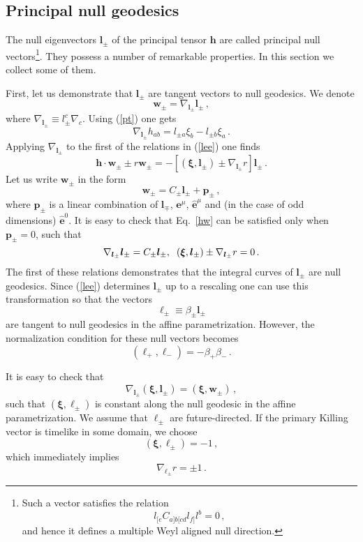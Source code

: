 \documentclass[superscriptaddress,twocolumn,showpacs,
preprintnumbers,amsmath,amssymb,nofootinbib,
longbibliography,aps,prd,10pt]{revtex4-1}
\newcommand{\hhh}{,\hspace{0.2cm}}
\newcommand{\ts}[1]{{\boldsymbol{#1}}}         %
\newcommand{\be}{\begin{equation}}             %
\newcommand{\ee}{\end{equation}}               %
\newcommand{\n}[1]{\label{#1}}
\begin{document}
\subsection{Principal null geodesics}

The null eigenvectors $\ts{l}_{\pm}$ of the principal tensor $\ts{h}$ are called principal null vectors\footnote{
Such a vector satisfies the relation \cite{Frolov:2017kze,Ortaggio:2017ydo}
\[
{l}_{[e}C_{a]b[cd}l_{f]}l^b=0 \, ,
\]
and hence it defines a multiple Weyl aligned null direction.
}. They possess a number of remarkable properties. In this section we collect some of them.

First, let us demonstrate that $\ts{l}_{\pm}$ are tangent vectors to null geodesics. We denote
\be
\ts{w}_{\pm}=\nabla_{\ts{l}_{\pm}}\ts{l}_{\pm}\, ,
\ee
where $\nabla_{\ts{l}_{\pm}} \equiv l^c_{\pm}\nabla_c$. Using (\ref{pt}) one gets
\be
\nabla_{\ts{l}_{\pm}}h_{ab}=l_{\pm a}\xi_b-l_{\pm b}\xi_a \, .
\ee
Applying $\nabla_{\ts{l}_{\pm}}$ to the first of the relations in (\ref{lee}) one finds
\be\n{hw}
\ts{h}\cdot \ts{w}_{\pm}\pm r \ts{w}_{\pm}=-[(\ts{\xi},\ts{l}_{\pm})\pm \nabla_{\ts{l}_{\pm}} r]\ts{l}_{\pm}\, .
\ee
Let us write $\ts{w}_{\pm}$ in the form
\be
\ts{w}_{\pm}=C_{\pm}\ts{l}_{\pm}+\ts{p}_{\pm}\, ,
\ee
where $\ts{p}_{\pm}$ is a linear combination of $\ts{l}_{\mp}$, $\ts{e}^{\mu}$, $\hat{\ts{e}}^{\mu}$ and (in the case of odd dimensions) $\hat{\ts{e}}^{0}$. It is easy to check that Eq.~\eqref{hw} can be satisfied only when $\ts{p}_{\pm}=0$, such that
\be
\nabla_{\ts{l}_{\pm}}\ts{l}_{\pm}=C_{\pm}\ts{l}_{\pm}\hhh (\ts{\xi},\ts{l}_{\pm})\pm \nabla_{\ts{l}_{\pm}} r=0\, .
\ee
The first of these relations demonstrates that the integral curves of $\ts{l}_{\pm}$ are null geodesics. Since (\ref{lee}) determines $\ts{l}_{\pm}$ up to a rescaling one can use this transformation so that the vectors
\be
\ts{\ell}_{\pm} \equiv \beta_{\pm}\ts{l}_{\pm}
\ee
are tangent to null geodesics in the affine parametrization. However, the normalization condition for these null vectors becomes
\be
(\ts{\ell}_+,\ts{\ell}_-)=-\beta_+ \beta_-\, .
\ee

It is easy to check that
\be
\nabla_{\ts{l}_{\pm}}(\ts{\xi},\ts{l}_{\pm})=(\ts{\xi},\ts{w}_{\pm})\, ,
\ee
such that $(\ts{\xi},\ts{\ell}_{\pm})$ is constant along the null geodesic in the affine parametrization. We assume that $\ts{\ell}_{\pm}$ are future-directed. If the primary Killing vector is timelike in some domain, we choose
\be
(\ts{\xi},\ts{\ell}_{\pm})=-1\, ,
\ee
which immediately implies
\be\n{lrr}
\nabla_{\ts{\ell}_{\pm}} r=\pm 1\, .
\ee
\end{document}
